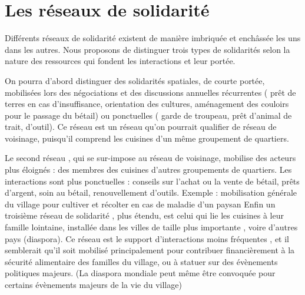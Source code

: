 \section{Les réseaux de solidarité}




Différents réseaux de solidarité existent de manière imbriquée et enchâssée les uns dans les autres. Nous proposons de distinguer trois types de solidarités selon la nature des ressources qui fondent les interactions et leur portée.

On pourra d'abord distinguer des solidarités spatiales, de courte portée,  mobilisées lors des négociations et des discussions annuelles récurrentes ( prêt de terres en cas d'insuffisance, orientation des cultures, aménagement des couloirs pour le passage du bétail) ou ponctuelles ( garde de troupeau, prêt d'animal de trait, d'outil).
Ce réseau est un réseau qu'on pourrait qualifier de réseau de  voisinage, puisqu'il comprend les cuisines d'un même groupement de quartiers.

Le second réseau , qui se sur-impose au réseau de voisinage,  mobilise des acteurs plus éloignés : des  membres des cuisines d'autres groupements de quartiers.
Les interactions sont plus ponctuelles : conseils sur l'achat ou la vente de bétail, prêts d'argent, soin au bétail, renouvellement d'outils. Exemple : mobilisation générale du village pour cultiver et récolter en cas de maladie d'un paysan
Enfin un troisième réseau de solidarité , plus étendu, est celui qui lie les cuisines à leur famille lointaine, installée dans les villes  de taille plus importante , voire d'autres pays (diaspora).
Ce réseau est le support d'interactions  moins fréquentes , et il semblerait qu'il soit mobilisé principalement pour contribuer financièrement à la sécurité alimentaire des familles du village, ou à statuer sur des évènements politiques majeurs. (La diaspora mondiale peut même être convoquée pour certains évènements majeurs de la vie du village)
